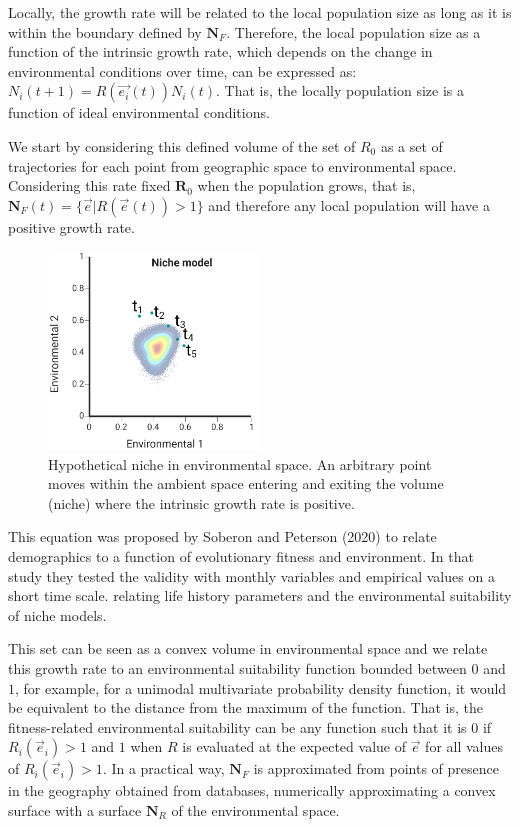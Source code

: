 \documentclass[
]{article}
\begin{document}
Locally, the growth rate will be related to the local population size as
long as it is within the boundary defined by \(\mathbf{N}_F\).
Therefore, the local population size as a function of the intrinsic
growth rate, which depends on the change in environmental conditions
over time, can be expressed as: \(N_i(t+1) = R(\vec{e_i}(t) ) N_i(t)\).
That is, the locally population size is a function of ideal
environmental conditions.

We start by considering this defined volume of the set of \(R_0\) as a
set of trajectories for each point from geographic space to
environmental space. Considering this rate fixed \(\mathbf{R}_0\) when
the population grows, that is,
\(\mathbf{N}_F(t) = \{\vec{e} | R(\vec{e}(t)) > 1 \}\) and therefore any
local population will have a positive growth rate.

\begin{figure}
\centering
\includegraphics[width=0.5\textwidth,height=\textheight]{all_figures/figure_1.png}
\caption{Hypothetical niche in environmental space. An arbitrary point
moves within the ambient space entering and exiting the volume (niche)
where the intrinsic growth rate is positive.}
\end{figure}

This equation was proposed by Soberon and Peterson (2020) to relate
demographics to a function of evolutionary fitness and environment. In
that study they tested the validity with monthly variables and empirical
values on a short time scale. relating life history parameters and the
environmental suitability of niche models.

This set can be seen as a convex volume in environmental space and we
relate this growth rate to an environmental suitability function bounded
between \(0\) and \(1\), for example, for a unimodal multivariate
probability density function, it would be equivalent to the distance
from the maximum of the function. That is, the fitness-related
environmental suitability can be any function such that it is \(0\) if
\(R_i(\vec{e}_i) > 1\) and \(1\) when \(R\) is evaluated at the expected
value of \(\vec {e}\) for all values of \(R_i(\vec{e}_i) > 1\). In a
practical way, \(\mathbf{N}_F\) is approximated from points of presence
in the geography obtained from databases, numerically approximating a
convex surface with a surface \(\mathbf{N}_R\) of the environmental
space.
\end{document}

